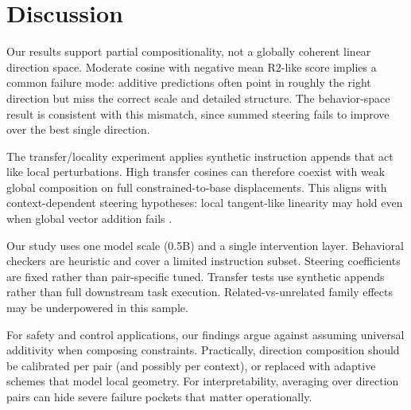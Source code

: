 \section{Discussion}
\label{sec:discussion}
Our results support partial compositionality, not a globally coherent linear direction space. Moderate cosine with negative mean R2-like score implies a common failure mode: additive predictions often point in roughly the right direction but miss the correct scale and detailed structure. The behavior-space result is consistent with this mismatch, since summed steering fails to improve over the best single direction.

The transfer/locality experiment applies synthetic instruction appends that act like local perturbations. High transfer cosines can therefore coexist with weak global composition on full constrained-to-base displacements. This aligns with context-dependent steering hypotheses: local tangent-like linearity may hold even when global vector addition fails \citep{li2026vectorfields}.

Our study uses one model scale (0.5B) and a single intervention layer. Behavioral checkers are heuristic and cover a limited instruction subset. Steering coefficients are fixed rather than pair-specific tuned. Transfer tests use synthetic appends rather than full downstream task execution. Related-vs-unrelated family effects may be underpowered in this sample.

For safety and control applications, our findings argue against assuming universal additivity when composing constraints. Practically, direction composition should be calibrated per pair (and possibly per context), or replaced with adaptive schemes that model local geometry. For interpretability, averaging over direction pairs can hide severe failure pockets that matter operationally.

